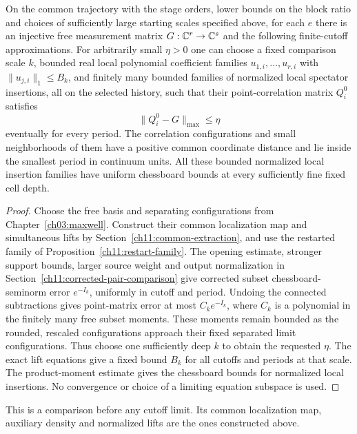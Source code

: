 \begin{proposition}
\label{ch11:finite-detector-input}
On the common trajectory with the stage orders, lower bounds on the block ratio and
choices of sufficiently large starting scales specified above, for each $e$ there is an injective free measurement matrix
$G:\mathbb C^r\to\mathbb C^s$ and the following finite-cutoff approximations.
For arbitrarily small $\eta>0$ one can choose a fixed comparison
scale $k$, bounded real local polynomial coefficient families
$u_{1,i},\ldots,u_{r,i}$ with $\|u_{j,i}\|_1\le B_k$, and finitely
many bounded families of normalized local spectator insertions, all on the selected
history, such that their point-correlation matrix $Q_i^0$
satisfies
\[
 \|Q_i^0-G\|_{\max}\le\eta
\]
eventually for every period. The correlation configurations and small
neighborhoods of them have a positive common coordinate distance
and lie inside the smallest period in continuum units. All these bounded
normalized local insertion families have uniform chessboard bounds at every
sufficiently fine fixed cell depth.
\end{proposition}
\begin{proof}
Choose the free basis and separating configurations from
Chapter~\ref{ch03:maxwell}. Construct their common
localization map and simultaneous lifts by
Section~\ref{ch11:common-extraction}, and use the restarted family
of Proposition~\ref{ch11:restart-family}.
The opening estimate, stronger support bounds, larger source weight and output normalization in
Section~\ref{ch11:corrected-pair-comparison} give corrected
subset chessboard-seminorm error $e^{-I_k}$, uniformly in cutoff and period.
Undoing the connected subtractions gives point-matrix error at
most $C_ke^{-I_k}$, where $C_k$ is a polynomial in the finitely
many free subset moments. These moments remain bounded as the
rounded, rescaled configurations approach their fixed separated
limit configurations. Thus choose one sufficiently deep $k$ to obtain the
requested $\eta$. The exact lift equations give a fixed bound
$B_k$ for all cutoffs and periods at that scale.
The product-moment estimate gives the chessboard bounds for normalized local insertions.
No convergence or choice of a limiting equation subspace is used.
\end{proof}

This is a comparison before any cutoff limit. Its common localization
map, auxiliary density and normalized lifts are the ones
constructed above.

